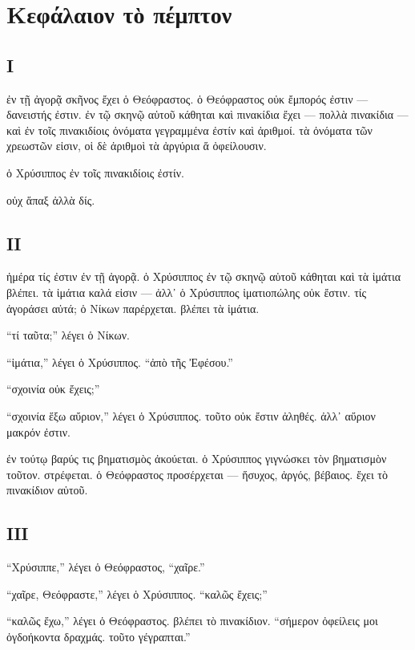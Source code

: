 \documentclass[a4paper]{report}
\begin{document}
\section{Κεφάλαιον τὸ
πέμπτον}\label{ux3baux3b5ux3c6ux3acux3bbux3b1ux3b9ux3bfux3bd-ux3c4ux1f78-ux3c0ux3adux3bcux3c0ux3c4ux3bfux3bd}

\subsection{Ι}\label{ux3b9-4}

ἐν τῇ ἀγορᾷ σκῆνος ἔχει ὁ Θεόφραστος. ὁ Θεόφραστος οὐκ ἔμπορός ἐστιν ---
δανειστής ἐστιν. ἐν τῷ σκηνῷ αὑτοῦ κάθηται καὶ πινακίδια ἔχει --- πολλὰ
πινακίδια --- καὶ ἐν τοῖς πινακιδίοις ὀνόματα γεγραμμένα ἐστίν καὶ
ἀριθμοί. τὰ ὀνόματα τῶν χρεωστῶν εἰσιν, οἱ δὲ ἀριθμοὶ τὰ ἀργύρια ἅ
ὀφείλουσιν.

ὁ Χρύσιππος ἐν τοῖς πινακιδίοις ἐστίν.

οὐχ ἅπαξ ἀλλὰ δίς.

\subsection{ΙΙ}\label{ux3b9ux3b9-4}

ἡμέρα τίς ἐστιν ἐν τῇ ἀγορᾷ. ὁ Χρύσιππος ἐν τῷ σκηνῷ αὑτοῦ κάθηται καὶ
τὰ ἱμάτια βλέπει. τὰ ἱμάτια καλά εἰσιν --- ἀλλ᾿ ὁ Χρύσιππος ἱματιοπώλης
οὐκ ἔστιν. τίς ἀγοράσει αὐτά; ὁ Νίκων παρέρχεται. βλέπει τὰ ἱμάτια.

``τί ταῦτα;'' λέγει ὁ Νίκων.

``ἱμάτια,'' λέγει ὁ Χρύσιππος. ``ἀπὸ τῆς Ἐφέσου.''

``σχοινία οὐκ ἔχεις;''

``σχοινία ἕξω αὔριον,'' λέγει ὁ Χρύσιππος. τοῦτο οὐκ ἔστιν ἀληθές. ἀλλ᾿
αὔριον μακρόν ἐστιν.

ἐν τούτῳ βαρύς τις βηματισμὸς ἀκούεται. ὁ Χρύσιππος γιγνώσκει τὸν
βηματισμὸν τοῦτον. στρέφεται. ὁ Θεόφραστος προσέρχεται --- ἥσυχος,
ἀργός, βέβαιος. ἔχει τὸ πινακίδιον αὑτοῦ.

\subsection{ΙΙΙ}\label{ux3b9ux3b9ux3b9-4}

``Χρύσιππε,'' λέγει ὁ Θεόφραστος, ``χαῖρε.''

``χαῖρε, Θεόφραστε,'' λέγει ὁ Χρύσιππος. ``καλῶς ἔχεις;''

``καλῶς ἔχω,'' λέγει ὁ Θεόφραστος. βλέπει τὸ πινακίδιον. ``σήμερον
ὀφείλεις μοι ὀγδοήκοντα δραχμάς. τοῦτο γέγραπται.''
\end{document}
